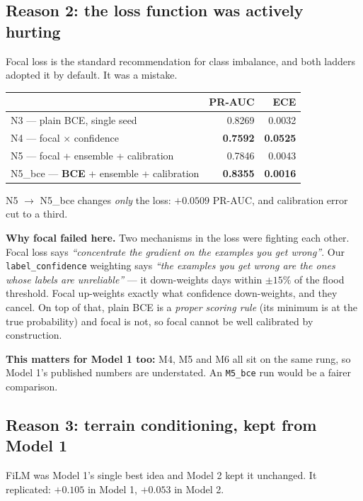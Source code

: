 \documentclass[11pt,a4paper]{article}
\newcommand{\good}[1]{\textcolor{green!45!black}{\textbf{#1}}}
\newcommand{\bad}[1]{\textcolor{red!65!black}{\textbf{#1}}}
\begin{document}
\subsection{Reason 2: the loss function was actively hurting}

Focal loss is the standard recommendation for class imbalance, and both ladders
adopted it by default. It was a mistake.

\begin{center}
\small
\begin{tabular}{@{}lrr@{}}
\toprule
& \textbf{PR-AUC} & \textbf{ECE} \\
\midrule
N3 --- plain BCE, single seed & 0.8269 & 0.0032 \\
N4 --- focal $\times$ confidence & \bad{0.7592} & \bad{0.0525} \\
N5 --- focal + ensemble + calibration & 0.7846 & 0.0043 \\
N5\_bce --- \textbf{BCE} + ensemble + calibration & \good{0.8355} & \good{0.0016} \\
\bottomrule
\end{tabular}
\end{center}

\noindent
N5 $\to$ N5\_bce changes \emph{only} the loss: $+0.0509$ PR-AUC, and calibration
error cut to a third.

\textbf{Why focal failed here.} Two mechanisms in the loss were fighting each
other. Focal loss says \emph{``concentrate the gradient on the examples you get
wrong''}. Our \texttt{label\_confidence} weighting says \emph{``the examples you
get wrong are the ones whose labels are unreliable''} --- it down-weights days
within $\pm 15\%$ of the flood threshold. Focal up-weights exactly what
confidence down-weights, and they cancel. On top of that, plain BCE is a
\emph{proper scoring rule} (its minimum is at the true probability) and focal is
not, so focal cannot be well calibrated by construction.

\textbf{This matters for Model 1 too:} M4, M5 and M6 all sit on the same rung, so
Model 1's published numbers are understated. An \texttt{M5\_bce} run would be a
fairer comparison.

\subsection{Reason 3: terrain conditioning, kept from Model 1}

FiLM was Model 1's single best idea and Model 2 kept it unchanged. It replicated:
$+0.105$ in Model 1, $+0.053$ in Model 2.
\end{document}

